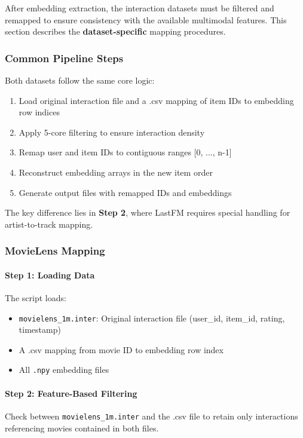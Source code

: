After embedding extraction, the interaction datasets must be filtered and remapped to ensure consistency with the available multimodal features. This section describes the \textbf{dataset-specific} mapping procedures.

\subsubsection{Common Pipeline Steps}

Both datasets follow the same core logic:
\begin{enumerate}
    \item Load original interaction file and a .csv mapping of item IDs to embedding row indices
    \item Apply 5-core filtering to ensure interaction density
    \item Remap user and item IDs to contiguous ranges [0, ..., n-1]
    \item Reconstruct embedding arrays in the new item order
    \item Generate output files with remapped IDs and embeddings
\end{enumerate}

The key difference lies in \textbf{Step 2}, where LastFM requires special handling for artist-to-track mapping.

\subsubsection{MovieLens Mapping}

\paragraph{Step 1: Loading Data}
The script loads:
\begin{itemize}
    \item \texttt{movielens\_1m.inter}: Original interaction file (user\_id, item\_id, rating, timestamp)
    \item A .csv mapping from movie ID to embedding row index
    \item All \texttt{.npy} embedding files
\end{itemize}

\paragraph{Step 2: Feature-Based Filtering}
Check between \texttt{movielens\_1m.inter} and the .csv file to retain only interactions referencing movies contained in both files.

